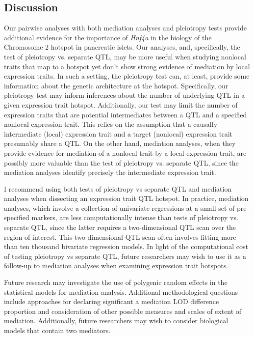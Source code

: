 \documentclass[oneside]{book}\usepackage[]{graphicx}\usepackage[]{color}
\begin{document}
\subsection{Discussion}

Our pairwise analyses with both mediation analyses and pleiotropy tests provide additional
evidence for the importance of \emph{Hnf4a} in the biology of the Chromosome 2 hotspot
in pancreatic islets. 
Our analyses, and, specifically, the test of pleiotropy vs. separate QTL, may be more useful
when studying nonlocal traits that map to a hotspot yet don't show strong evidence
of mediation by local expression traits. 
In such a setting, the pleiotropy test can, at least, provide some information about 
the genetic architecture at the hotspot. 
Specifically, our pleiotropy test may inform inferences about the number of 
underlying QTL in a given expression trait hotspot. 
Additionally, our test may limit the number of expression traits that are 
potential intermediates between a QTL and a specified nonlocal expression trait. 
This relies on the assumption that a causally intermediate (local) expression trait and a
target (nonlocal) expression trait presumably share a QTL. On the other hand, mediation analyses, when they provide evidence for mediation of a nonlocal
trait by a local expression trait, are possibly more valuable than the test of pleiotropy vs.
separate QTL, since the mediation analyses identify precisely the intermediate expression trait.

I recommend using both tests of pleiotropy vs separate QTL and mediation analyses when
dissecting an expression trait QTL hotspot. 
In practice, mediation analyses, which involve a collection of univariate regressions at a small
set of pre-specified markers, are less computationally intense than tests of pleiotropy vs.
separate QTL, since the latter requires a two-dimensional QTL scan over the region of interest.
This two-dimensional QTL scan often involves fitting more than ten thousand bivariate regression
models. In light of the computational cost of testing pleiotropy vs separate QTL, future
researchers may wish to use it as a follow-up to mediation analyses when examining expression
trait hotspots.

Future research may investigate the use of polygenic random effects in the statistical models
for mediation analysis. Additional methodological questions include approaches for declaring
significant a mediation LOD difference proportion and consideration of other possible measures
and scales of extent of mediation. Additionally, future researchers may wish to consider
biological models that contain two mediators.
\end{document}

